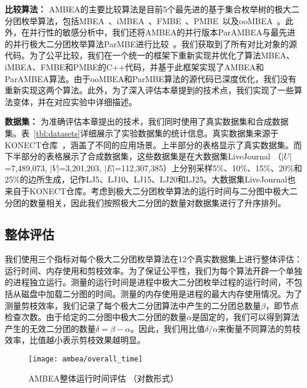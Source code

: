 \textbf{比较算法：} AMBEA的主要比较算法是目前5个最先进的基于集合枚举树的极大二分团枚举算法，包括MBEA~\cite{iMBEA14}、iMBEA~\cite{iMBEA14}、FMBE~\cite{parMBE19}、PMBE~\cite{PMBE20}以及ooMBEA~\cite{ooMBE22}。此外，在并行性的敏感分析中，我们还将AMBEA的并行版本ParAMBEA与最先进的并行极大二分团枚举算法ParMBE进行比较~\cite{parMBE19}。我们获取到了所有对比对象的源代码。为了公平比较，我们在一个统一的框架下重新实现并优化了算法MBEA、iMBEA、FMBE和PMBE的C++代码，并基于此框架实现了AMBEA和ParAMBEA算法。由于ooMBEA和ParMBE算法的源代码已深度优化，我们没有重新实现这两个算法。此外，为了深入评估本章提到的技术点，我们实现了一些算法变体，并在对应实验中详细描述。

 

\textbf{数据集：} 为准确评估本章提出的技术，我们同时使用了真实数据集和合成数据集。表~\ref{tbl:datasets}详细展示了实验数据集的统计信息。真实数据集来源于KONECT仓库~\cite{konect}，涵盖了不同的应用场景。上半部分的表格显示了真实数据集。而下半部分的表格展示了合成数据集，这些数据集是在大数据集LiveJournal （$|U|$=7,489,073, $|V|$=3,201,203, $|E|$=112,307,385）上分别采样5\%、10\%、15\%、20\%和25\%的边所生成，记作LJ5、LJ10、LJ15、LJ20和LJ25。大数据集LiveJournal也来自于KONECT仓库。考虑到极大二分团枚举算法的运行时间与二分图中极大二分团的数量相关，因此我们按照极大二分团的数量对数据集进行了升序排列。

\subsection{整体评估}
\label{subsec:ambea_exp_overall}

我们使用三个指标对每个极大二分团枚举算法在12个真实数据集上进行整体评估：运行时间、内存使用和剪枝效率。为了保证公平性，我们为每个算法开辟一个单独的进程独立运行。测量的运行时间是进程中极大二分团枚举过程的运行时间，不包括从磁盘中加载二分图的时间。测量的内存使用是进程的最大内存使用情况。为了测量剪枝效率，我们记录了每个极大二分团算法中产生的二分团总数量$\beta$，即节点检查次数。由于给定的二分图中极大二分团的数量$\alpha$是固定的，我们可以得到算法产生的无效二分团的数量$\delta=\beta-\alpha$。因此，我们用比值$\delta/\alpha$来衡量不同算法的剪枝效率，比值越小表示剪枝效果越明显。

\begin{figure} [H]
  \centering
  \vspace{0.1in}
  \texttt{[image: ambea/overall\_time]}
  \caption{AMBEA整体运行时间评估 （对数形式）}
  \label{fig:ambea_overall_time}
\end{figure}


